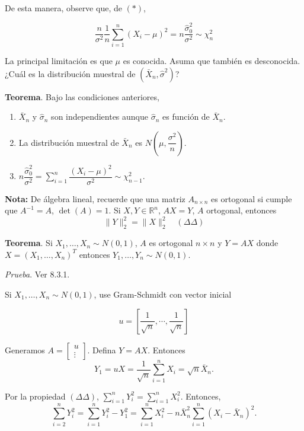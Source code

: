 \documentclass[
  12pt,
]{book}
\begin{document}
De esta manera, observe que, de \((*)\),

\[\dfrac{n}{\sigma^2} \dfrac{1}n \sum_{i=1}^n(X_i-\mu)^2 = n\dfrac{\hat \sigma_{0}^2}{\sigma^2} \sim \chi^2_n \]

La principal limitación es que \(\mu\) es conocida. Asuma que también es
desconocida. ¿Cuál es la distribución muestral de \((\bar X_n,\hat\sigma^2)\)?

\textbf{Teorema}. Bajo las condiciones anteriores,

\begin{enumerate}
\def\labelenumi{\arabic{enumi}.}
\item
  \(\bar X_n\) y \(\hat \sigma_n\) son independientes aunque \(\hat \sigma_n\) es función de
  \(\bar X_n\).
\item
  La distribución muestral de \(\bar X_n\) es \(N\left(\mu,\dfrac{\sigma^2}{n}\right)\).
\item
  \(n\dfrac{\hat \sigma_{0}^2}{\sigma^2} =\sum_{i=1}^n \dfrac{(X_i-\mu)^2}{\sigma^2} \sim \chi^2_{n-1}\).
\end{enumerate}

\textbf{Nota:} De álgebra lineal, recuerde que una matriz \(A_{n\times n}\) es ortogonal si
cumple que \(A^{-1} = A\), \(\det(A) = 1\). Si \(X, Y\in \mathbb R ^{n}\), \(AX =Y\), \(A\)
ortogonal, entonces \[ \|Y\|_2^2 = \|X\|_2^2 \quad (\Delta\Delta)\]

\textbf{Teorema}. Si \(X_1,\dots,X_n \sim N(0,1)\), \(A\) es ortogonal \(n\times n\) y \(Y=AX\) donde
\(X = (X_1,\dots,X_n)^T\) entonces \(Y_1,\dots,Y_n \sim N(0,1)\).

\emph{Prueba}. Ver 8.3.1.

Si \(X_1,\dots,X_n \sim N(0,1)\), use Gram-Schmidt con vector inicial

\begin{equation*}
u = \left[ \frac{1}{\sqrt{n}}, \cdots, \frac{1}{\sqrt{n}}\right]
\end{equation*}

Generamos \(A = \begin{bmatrix}u\\\vdots\end{bmatrix}\). Defina \(Y =AX\). Entonces \[ Y_1 = uX = \dfrac 1{\sqrt{n}}\sum_{i=1}^n X_i = \sqrt{n} \bar
X_n.\]

Por la propiedad \((\Delta \Delta)\), \(\displaystyle\sum_{i=1}^n Y_i^2 = \displaystyle\sum_{i=1}^n X_i^2\). Entonces,
\[ \sum_{i=2}^nY_i^2 = \sum_{i=1}^nY_i^2 - Y_1^2 = \sum_{i=1}^nX_i^2-n\bar X_n^2\sum_{i=1}^n(X_i-\bar X_n)^2. \]
\end{document}
